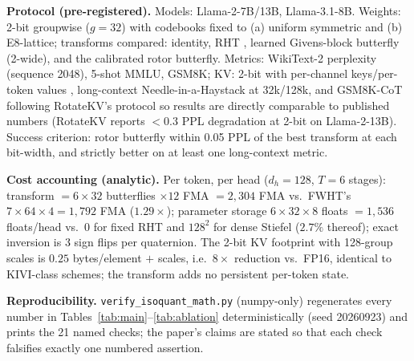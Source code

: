 \documentclass{article}
\begin{document}
\textbf{Protocol (pre-registered).} Models: Llama-2-7B/13B, Llama-3.1-8B.
Weights: 2-bit groupwise ($g=32$) with codebooks fixed to (a) uniform
symmetric and (b) E8-lattice; transforms compared: identity, RHT
\citep{tseng2024quipsharp}, learned Givens-block butterfly (2-wide), and the
calibrated rotor butterfly. Metrics: WikiText-2 perplexity (sequence 2048),
5-shot MMLU, GSM8K; KV: 2-bit with per-channel keys/per-token values
\citep{liu2024kivi}, long-context Needle-in-a-Haystack at 32k/128k, and
GSM8K-CoT following RotateKV's protocol \citep{su2025rotatekv} so results are
directly comparable to published numbers (RotateKV reports $<0.3$ PPL
degradation at 2-bit on Llama-2-13B).
Success criterion: rotor butterfly within 0.05 PPL of the best
transform at each bit-width, and strictly better on at least one long-context
metric.

\textbf{Cost accounting (analytic).} Per token, per head
($d_h=128$, $T=6$ stages): transform $=6\times32$ butterflies $\times12$ FMA
$=2{,}304$ FMA vs.\ FWHT's $7\times64\times4=1{,}792$ FMA ($1.29\times$);
parameter storage $6\times32\times8$ floats $=1{,}536$ floats/head vs.\ 0 for
fixed RHT and $128^2$ for dense Stiefel ($2.7\%$ thereof); exact inversion is
3 sign flips per quaternion. The 2-bit KV footprint with 128-group scales is
$0.25$ bytes/element $+$ scales, i.e.\ $8\times$ reduction vs.\ FP16,
identical to KIVI-class schemes; the transform adds no persistent per-token
state.

\textbf{Reproducibility.} \texttt{verify\_isoquant\_math.py} (numpy-only)
regenerates every number in
Tables~\ref{tab:main}--\ref{tab:ablation} deterministically (seed 20260923)
and prints the 21 named checks; the paper's claims are stated so that each
check falsifies exactly one numbered assertion.
\end{document}
